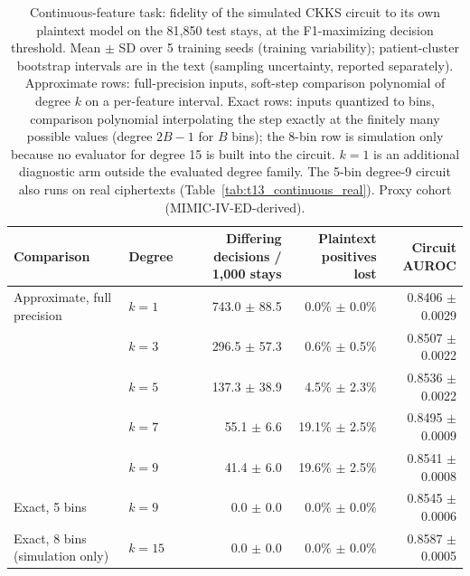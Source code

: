 \begin{table}[t]
\centering
\caption{Continuous-feature task: fidelity of the simulated CKKS circuit to its own plaintext model on the 81,850 test stays, at the F1-maximizing decision threshold. Mean $\pm$ SD over 5 training seeds (training variability); patient-cluster bootstrap intervals are in the text (sampling uncertainty, reported separately). Approximate rows: full-precision inputs, soft-step comparison polynomial of degree $k$ on a per-feature interval. Exact rows: inputs quantized to bins, comparison polynomial interpolating the step exactly at the finitely many possible values (degree $2B-1$ for $B$ bins); the 8-bin row is simulation only because no evaluator for degree 15 is built into the circuit. $k=1$ is an additional diagnostic arm outside the evaluated degree family. The 5-bin degree-9 circuit also runs on real ciphertexts (Table~\ref{tab:t13_continuous_real}). Proxy cohort (MIMIC-IV-ED-derived).}
\label{tab:t11_continuous_fidelity}
\begin{tabular}{llrrr}
\toprule
Comparison & Degree & Differing decisions / 1,000 stays & Plaintext positives lost & Circuit AUROC \\
\midrule
Approximate, full precision & $k=1$ & 743.0 $\pm$ 88.5 & 0.0\% $\pm$ 0.0\% & 0.8406 $\pm$ 0.0029 \\
 & $k=3$ & 296.5 $\pm$ 57.3 & 0.6\% $\pm$ 0.5\% & 0.8507 $\pm$ 0.0022 \\
 & $k=5$ & 137.3 $\pm$ 38.9 & 4.5\% $\pm$ 2.3\% & 0.8536 $\pm$ 0.0022 \\
 & $k=7$ & 55.1 $\pm$ 6.6 & 19.1\% $\pm$ 2.5\% & 0.8495 $\pm$ 0.0009 \\
 & $k=9$ & 41.4 $\pm$ 6.0 & 19.6\% $\pm$ 2.5\% & 0.8541 $\pm$ 0.0008 \\
\midrule
Exact, 5 bins & $k=9$ & 0.0 $\pm$ 0.0 & 0.0\% $\pm$ 0.0\% & 0.8545 $\pm$ 0.0006 \\
Exact, 8 bins (simulation only) & $k=15$ & 0.0 $\pm$ 0.0 & 0.0\% $\pm$ 0.0\% & 0.8587 $\pm$ 0.0005 \\
\bottomrule
\end{tabular}
\end{table}
